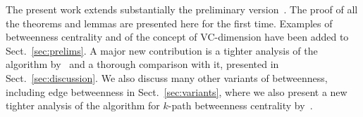 \ifproof
The present work extends substantially the preliminary
version~\citep{RiondatoK14WSDM}. The proof of all the theorems and lemmas are
presented here for the first time. Examples of betweenness centrality and of the
concept of VC-dimension have been added to Sect.~\ref{sec:prelims}. A major new
contribution is a tighter analysis of the algorithm by~\citet{BrandesP07} and
a thorough comparison with it, presented in Sect.~\ref{sec:discussion}. We also
discuss many other variants of betweenness, including edge betweenness in
Sect.~\ref{sec:variants}, where we also present a new tighter analysis of the
algorithm for $k$-path betweenness centrality by~\citet{KourtellisASIT12}.  %
\fi

